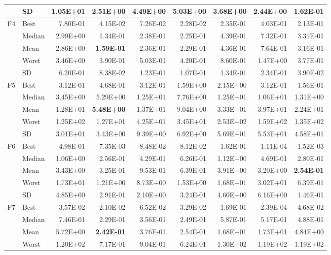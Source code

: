 \documentclass[10pt,a4paper]{article}
\newcommand{\bestval}[1]{\textbf{#1}}
\begin{document}
\begin{table}[p]
\begin{tabular}{llrrrrrrr}
 & SD & 1.05E+01 & 2.51E+00 & 4.49E+00 & 5.03E+00 & 3.68E+00 & 2.44E+00 & 1.62E-01 \\
\midrule
F4 & Best & 7.80E-01 & 4.15E-02 & 7.26E-02 & 2.28E-02 & 2.35E-01 & 4.03E-01 & 2.13E-01 \\
 & Median & 2.99E+00 & 1.34E-01 & 2.38E-01 & 2.25E-01 & 4.39E-01 & 7.32E-01 & 3.31E-01 \\
 & Mean & 2.86E+00 & \bestval{1.59E-01} & 2.36E-01 & 2.29E-01 & 4.36E-01 & 7.64E-01 & 3.16E-01 \\
 & Worst & 3.46E+00 & 3.90E-01 & 5.03E-01 & 4.20E-01 & 8.60E-01 & 1.47E+00 & 3.77E-01 \\
 & SD & 6.20E-01 & 8.38E-02 & 1.23E-01 & 1.07E-01 & 1.34E-01 & 2.34E-01 & 3.90E-02 \\
\midrule
F5 & Best & 3.12E-01 & 4.68E-01 & 3.12E-01 & 1.59E+00 & 2.15E+00 & 3.12E-01 & 1.56E-01 \\
 & Median & 3.45E+00 & 5.29E+00 & 1.25E+01 & 7.76E+00 & 1.25E+01 & 1.06E+01 & 1.31E+00 \\
 & Mean & 1.28E+01 & \bestval{5.48E+00} & 1.37E+01 & 9.04E+00 & 3.33E+01 & 3.97E+01 & 2.24E+01 \\
 & Worst & 1.25E+02 & 1.27E+01 & 4.25E+01 & 3.45E+01 & 2.53E+02 & 1.59E+02 & 1.35E+02 \\
 & SD & 3.01E+01 & 3.43E+00 & 9.39E+00 & 6.92E+00 & 5.69E+01 & 5.53E+01 & 4.58E+01 \\
\midrule
F6 & Best & 4.98E-01 & 7.35E-03 & 8.48E-02 & 8.12E-02 & 1.62E-01 & 1.11E-04 & 1.52E-03 \\
 & Median & 1.06E+00 & 2.56E-01 & 4.29E-01 & 6.26E-01 & 1.12E+00 & 4.69E-01 & 2.80E-01 \\
 & Mean & 3.43E+00 & 3.25E-01 & 9.53E-01 & 6.39E-01 & 3.91E+00 & 3.20E+00 & \bestval{2.54E-01} \\
 & Worst & 1.73E+01 & 1.21E+00 & 8.73E+00 & 1.53E+00 & 1.68E+01 & 3.02E+01 & 6.39E-01 \\
 & SD & 4.85E+00 & 2.91E-01 & 2.10E+00 & 3.24E-01 & 4.60E+00 & 6.16E+00 & 1.46E-01 \\
\midrule
F7 & Best & 3.57E-02 & 2.10E-02 & 6.52E-02 & 3.29E-02 & 1.69E-01 & 2.39E-04 & 4.68E-02 \\
 & Median & 7.46E-01 & 2.29E-01 & 3.56E-01 & 2.49E-01 & 5.87E-01 & 5.17E-01 & 4.88E-01 \\
 & Mean & 5.72E+00 & \bestval{2.42E-01} & 3.76E-01 & 2.54E-01 & 1.68E+01 & 1.73E+01 & 4.84E+00 \\
 & Worst & 1.20E+02 & 7.17E-01 & 9.04E-01 & 6.24E-01 & 1.30E+02 & 1.19E+02 & 1.19E+02 \\

\end{tabular}
\end{table}
\end{document}
